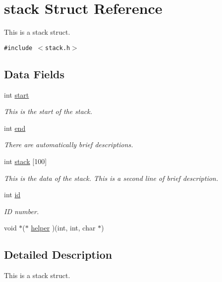 \hypertarget{structstack}{
\section{stack Struct Reference}
\label{structstack}
}
This is a stack struct. 


{\tt \#include $<$stack.h$>$}

\subsection*{Data Fields}
\begin{CompactItemize}
\item 
int \hyperlink{structstack_m0}{start}
\begin{CompactList}\small\item\em This is the start of the stack.\item\end{CompactList}\item 
\hypertarget{structstack_m1}{
int \hyperlink{structstack_m1}{end}}
\label{structstack_m1}

\begin{CompactList}\small\item\em There are automatically brief descriptions.\item\end{CompactList}\item 
int \hyperlink{structstack_m2}{stack} \mbox{[}100\mbox{]}
\begin{CompactList}\small\item\em This is the data of the stack. This is a second line of brief description.\item\end{CompactList}\item 
\hypertarget{structstack_m3}{
int \hyperlink{structstack_m3}{id}}
\label{structstack_m3}

\begin{CompactList}\small\item\em ID number.\item\end{CompactList}\item 
void $\ast$($\ast$ \hyperlink{structstack_m4}{helper} )(int, int, char $\ast$)
\end{CompactItemize}


\subsection{Detailed Description}
This is a stack struct.

